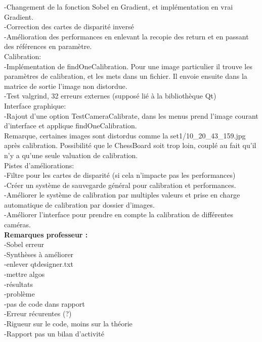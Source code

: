 \documentclass{article}
\begin{document}
    -Changement de la fonction Sobel en Gradient, et implémentation en vrai Gradient.\\
    -Correction des cartes de disparité inversé\\
    -Amélioration des performances en enlevant la recopie des return et en passant des références en paramètre.\\
   

Calibration:\\
    -Implémentation de findOneCalibration. Pour une image particulier il trouve les paramètres de calibration, et les mets dans un fichier. Il envoie ensuite dans la matrice de sortie l'image non distordue.\\
    -Test valgrind, 32 erreurs externes (supposé lié à la bibliothèque Qt)\\

Interface graphique:\\
    -Rajout d'une option TestCameraCalibrate, dans les menus prend l'image courant d'interface et applique findOneCalibration.\\
Remarque, certaines images sont distordus comme la set1/10\_20\_43\_159.jpg après calibration. Possibilité que le ChessBoard soit trop loin, couplé au fait qu'il n'y a qu'une seule valuation de calibration.
\\

Pistes d'améliorations:\\
    -Filtre pour les cartes de disparité (si cela n'impacte pas les performances)\\
    -Créer un système de sauvegarde général pour calibration et performances.\\
    -Améliorer le système de calibration par multiples valeurs et prise en charge automatique de calibration par dossier d'images.\\
    -Améliorer l'interface pour prendre en compte la calibration de différentes caméras.\\

\textbf{Remarques professeur :}\\
-Sobel erreur\\
-Synthèses à améliorer\\
-enlever qtdesigner.txt\\
-mettre algos\\
-résultats\\
-problème\\
-pas de code dans rapport\\
-Erreur récurentes (?)\\
-Rigueur sur le code, moins sur la théorie\\
-Rapport pas un bilan d'activité\\
\\
\end{document}
